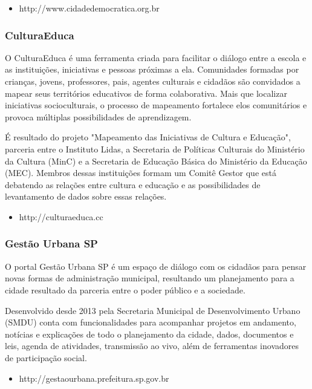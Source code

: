 \documentclass[12pt]{article}
\begin{document}
\begin{itemize}
  \item http://www.cidadedemocratica.org.br
\end{itemize}

\subsubsection{CulturaEduca}

O CulturaEduca é uma ferramenta criada para facilitar o diálogo entre a escola
e as instituições, iniciativas e pessoas próximas a ela. Comunidades formadas
por crianças, jovens, professores, pais, agentes culturais e cidadãos são
convidados a mapear seus territórios educativos de forma colaborativa. Mais
que localizar iniciativas socioculturais, o processo de mapeamento fortalece
elos comunitários e provoca múltiplas possibilidades de aprendizagem.

É resultado do projeto "Mapeamento das Iniciativas de Cultura e
Educação", parceria entre o Instituto Lidas, a Secretaria de Políticas
Culturais do Ministério da Cultura (MinC) e a Secretaria de Educação Básica do
Ministério da Educação (MEC). Membros dessas instituições formam um Comitê
Gestor que está debatendo as relações entre cultura e educação e as
possibilidades de levantamento de dados sobre essas relações. 

\begin{itemize}
  \item http://culturaeduca.cc
\end{itemize}

\subsubsection{Gestão Urbana SP}

O portal Gestão Urbana SP é um espaço de diálogo com os cidadãos para pensar
novas formas de administração municipal, resultando um planejamento para a
cidade resultado da parceria entre o poder público e a sociedade.

Desenvolvido desde 2013 pela Secretaria Municipal de Desenvolvimento Urbano
(SMDU) conta com funcionalidades para acompanhar projetos em andamento,
notícias e explicações de todo o planejamento da cidade, dados, documentos e
leis, agenda de atividades, transmissão ao vivo, além de ferramentas
inovadores de participação social.

\begin{itemize}
  \item http://gestaourbana.prefeitura.sp.gov.br
\end{itemize}
\end{document}
